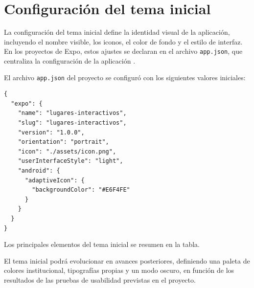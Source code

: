 
\section{Configuraci\'on del tema inicial}

La configuraci\'on del tema inicial define la identidad visual de la
aplicaci\'on, incluyendo el nombre visible, los iconos, el color de fondo y el
estilo de interfaz. En los proyectos de Expo, estos ajustes se declaran en el
archivo \texttt{app.json}, que centraliza la configuraci\'on de la aplicaci\'on
\citep{expo}.

El archivo \texttt{app.json} del proyecto se configur\'o con los siguientes
valores iniciales:

\begin{lstlisting}
{
  "expo": {
    "name": "lugares-interactivos",
    "slug": "lugares-interactivos",
    "version": "1.0.0",
    "orientation": "portrait",
    "icon": "./assets/icon.png",
    "userInterfaceStyle": "light",
    "android": {
      "adaptiveIcon": {
        "backgroundColor": "#E6F4FE"
      }
    }
  }
}
\end{lstlisting}

Los principales elementos del tema inicial se resumen en la tabla.

\begin{table}[H]
  \centering
  \caption{Elementos del tema inicial de la aplicaci\'on}
\end{table}

El tema inicial podr\'a evolucionar en avances posteriores, definiendo una
paleta de colores institucional, tipograf\'ias propias y un modo oscuro, en
funci\'on de los resultados de las pruebas de usabilidad previstas en el
proyecto.

